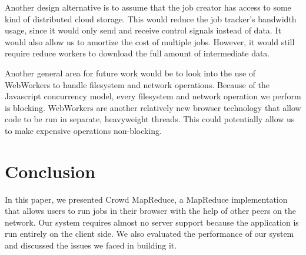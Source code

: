 \documentclass{article} %
\begin{document}
Another design alternative is to assume that the job creator has access to some
kind of distributed cloud storage. This would reduce the job tracker's
bandwidth usage, since it would only send and receive control signals instead
of data. It would also allow us to amortize the cost of multiple jobs. However,
it would still require reduce workers to download the full amount of
intermediate data.

Another general area for future work would be to look into the use of WebWorkers
to handle filesystem and network operations. Because of the Javascript
concurrency model, every filesystem and network operation we perform is
blocking. WebWorkers are another relatively new browser technology that allow
code to be run in separate, heavyweight threads. This could potentially allow us
to make expensive operations non-blocking.

\section{Conclusion}
In this paper, we presented Crowd MapReduce, a MapReduce implementation that
allows users to run jobs in their browser with the help of other peers on the
network. Our system requires almost no server support because the application is
run entirely on the client side. We also evaluated the performance of our system and
discussed the issues we faced in building it.



\end{document}
